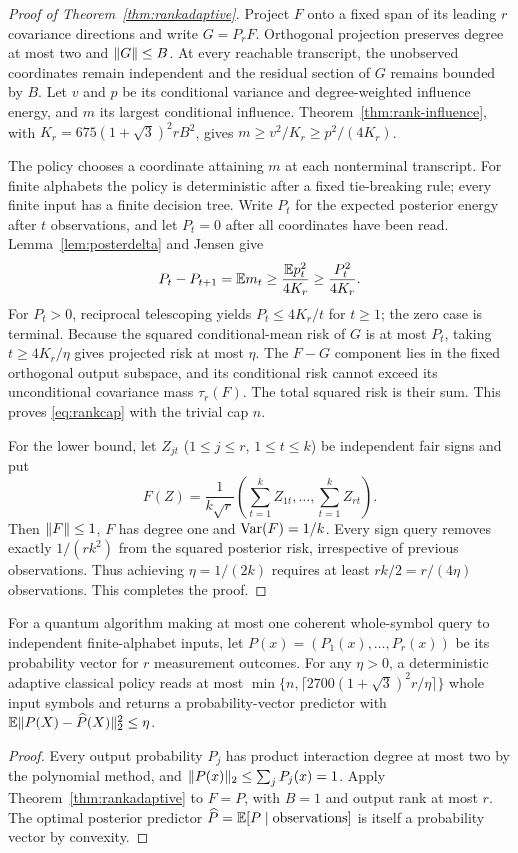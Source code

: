 \begin{proof}[Proof of Theorem~\ref{thm:rankadaptive}]
Project $F$ onto a fixed span of its leading $r$ covariance directions and write $G=P_rF$. Orthogonal projection preserves degree at most two and $\lVert G\rVert\le B$. At every reachable transcript, the unobserved coordinates remain independent and the residual section of $G$ remains bounded by $B$. Let $v$ and $p$ be its conditional variance and degree-weighted influence energy, and $m$ its largest conditional influence. Theorem~\ref{thm:rank-influence}, with $K_r=675(1+\sqrt3)^2rB^2$, gives $m\ge v^2/K_r\ge p^2/(4K_r)$.

The policy chooses a coordinate attaining $m$ at each nonterminal transcript. For finite alphabets the policy is deterministic after a fixed tie-breaking rule; every finite input has a finite decision tree. Write $P_t$ for the expected posterior energy after $t$ observations, and let $P_t=0$ after all coordinates have been read. Lemma~\ref{lem:posterdelta} and Jensen give
\[
 P_t-P_{t+1}=\mathbb E m_t\ge\frac{\mathbb E p_t^2}{4K_r}\ge\frac{P_t^2}{4K_r}.
\]
For $P_t>0$, reciprocal telescoping yields $P_t\le4K_r/t$ for $t\ge1$; the zero case is terminal. Because the squared conditional-mean risk of $G$ is at most $P_t$, taking $t\ge4K_r/\eta$ gives projected risk at most $\eta$. The $F-G$ component lies in the fixed orthogonal output subspace, and its conditional risk cannot exceed its unconditional covariance mass $\tau_r(F)$. The total squared risk is their sum. This proves \eqref{eq:rankcap} with the trivial cap $n$.

For the lower bound, let $Z_{jt}$ ($1\le j\le r$, $1\le t\le k$) be independent fair signs and put
\[
 F(Z)=\frac1{k\sqrt r}\left(\sum_{t=1}^kZ_{1t},\ldots,\sum_{t=1}^kZ_{rt}\right).
\]
Then $\lVert F\rVert\le1$, $F$ has degree one and $\operatorname{Var}(F)=1/k$. Every sign query removes exactly $1/(rk^2)$ from the squared posterior risk, irrespective of previous observations. Thus achieving $\eta=1/(2k)$ requires at least $rk/2=r/(4\eta)$ observations. This completes the proof.
\end{proof}

\begin{corollary}\label{cor:outcomedistribution}
For a quantum algorithm making at most one coherent whole-symbol query to independent finite-alphabet inputs, let $P(x)=(P_1(x),\ldots,P_r(x))$ be its probability vector for $r$ measurement outcomes. For any $\eta>0$, a deterministic adaptive classical policy reads at most
$\min\{n,\lceil2700(1+\sqrt3)^2r/\eta\rceil\}$ whole input symbols and returns a probability-vector predictor with $\mathbb E\lVert P(X)-\widehat P(X)\rVert_2^2\le\eta$.
\end{corollary}
\begin{proof}
Every output probability $P_j$ has product interaction degree at most two by the polynomial method, and $\lVert P(x)\rVert_2\le\sum_jP_j(x)=1$. Apply Theorem~\ref{thm:rankadaptive} to $F=P$, with $B=1$ and output rank at most $r$. The optimal posterior predictor $\widehat P=\mathbb E[P\mid\text{observations}]$ is itself a probability vector by convexity.
\end{proof}

